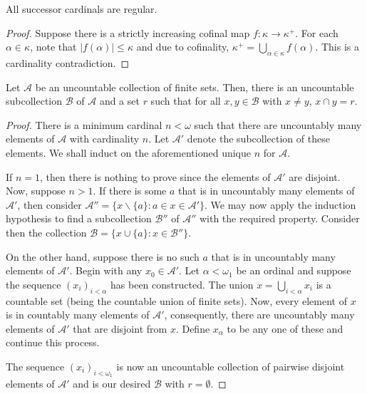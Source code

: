 \begin{lemma}
    All successor cardinals are regular.
\end{lemma}
\begin{proof}
    Suppose there is a strictly increasing cofinal map $f:\kappa\to\kappa^+$. For each $\alpha\in\kappa$, note that $|f(\alpha)|\le\kappa$ and due to cofinality, $\kappa^+ = \bigcup_{\alpha\in\kappa} f(\alpha)$. This is a cardinality contradiction.
\end{proof}

\begin{lemma}
    Let $\mathscr A$ be an uncountable collection of finite sets. Then, there is an uncountable subcollection $\mathscr B$ of $\mathscr A$ and a set $r$ such that for all $x,y\in\mathscr B$ with $x\ne y$, $x\cap y = r$.
\end{lemma}
\begin{proof}
    There is a minimum cardinal $n < \omega$ such that there are uncountably many elements of $\mathscr A$ with cardinality $n$. Let $\mathscr A'$ denote the subcollection of these elements. We shall induct on the aforementioned unique $n$ for $\mathscr A$. 
    
    If $n = 1$, then there is nothing to prove since the elements of $\mathscr A'$ are disjoint. Now, suppose $n > 1$. If there is some $a$ that is in uncountably many elements of $\mathscr A'$, then consider $\mathscr A'' = \{x\backslash\{a\}\colon a\in x\in\mathscr A'\}$. We may now apply the induction hypothesis to find a subcollection $\mathscr B''$ of $\mathscr A''$ with the required property. Consider then the collection $\mathscr B = \{x\cup\{a\}\colon x\in\mathscr B''\}$.

    On the other hand, suppose there is no such $a$ that is in uncountably many elements of $\mathscr A'$. Begin with any $x_0\in\mathscr A'$. Let $\alpha < \omega_1$ be an ordinal and suppose the sequence $(x_i)_{i < \alpha}$ has been constructed. The union $x = \bigcup_{i < \alpha} x_i$ is a countable set (being the countable union of finite sets). Now, every element of $x$ is in countably many elements of $\mathscr A'$, consequently, there are uncountably many elements of $\mathscr A'$ that are disjoint from $x$. Define $x_\alpha$ to be any one of these and continue this process. 

    The sequence $(x_i)_{i < \omega_1}$ is now an uncountable collection of pairwise disjoint elements of $\mathscr A'$ and is our desired $\mathscr B$ with $r = \emptyset$.
\end{proof}

